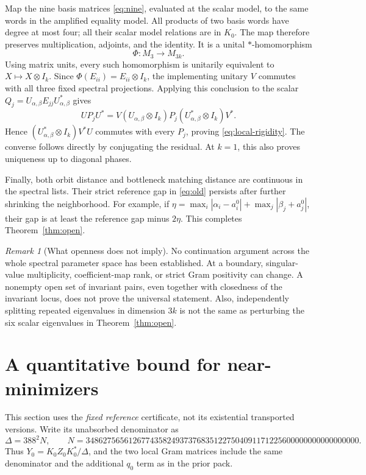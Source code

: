 \documentclass[11pt]{article}
\theoremstyle{remark}\newtheorem{remark}[theorem]{Remark}
\begin{document}
Map the nine basis matrices \eqref{eq:nine}, evaluated at the scalar model, to the same words in the amplified equality model. All products of two basis words have degree at most four; all their scalar model relations are in $K_0$. The map therefore preserves multiplication, adjoints, and the identity. It is a unital $*$-homomorphism
\[
 \Phi:M_3\longrightarrow M_{3k}.
\]
Using matrix units, every such homomorphism is unitarily equivalent to $X\mapsto X\otimes I_k$. Since $\Phi(E_{ii})=E_{ii}\otimes I_k$, the implementing unitary $V$ commutes with all three fixed spectral projections. Applying this conclusion to the scalar $Q_j=U_{\alpha,\beta}E_{jj}U_{\alpha,\beta}^*$ gives
\[
 UP_jU^*=V(U_{\alpha,\beta}\otimes I_k)P_j(U_{\alpha,\beta}^*\otimes I_k)V^*.
\]
Hence $(U_{\alpha,\beta}^*\otimes I_k)V^*U$ commutes with every $P_j$, proving \eqref{eq:local-rigidity}. The converse follows directly by conjugating the residual. At $k=1$, this also proves uniqueness up to diagonal phases.

Finally, both orbit distance and bottleneck matching distance are continuous in the spectral lists. Their strict reference gap in \eqref{eq:old} persists after further shrinking the neighborhood. For example, if $\eta=\max_i|\alpha_i-a_i^0|+\max_j|\beta_j+a_j^0|$, their gap is at least the reference gap minus $2\eta$. This completes Theorem~\ref{thm:open}.

\begin{remark}[What openness does not imply]
No continuation argument across the whole spectral parameter space has been established. At a boundary, singular-value multiplicity, coefficient-map rank, or strict Gram positivity can change. A nonempty open set of invariant pairs, even together with closedness of the invariant locus, does not prove the universal statement. Also, independently splitting repeated eigenvalues in dimension $3k$ is not the same as perturbing the six scalar eigenvalues in Theorem~\ref{thm:open}.
\end{remark}

\section{A quantitative bound for near-minimizers}
This section uses the \emph{fixed reference} certificate, not its existential transported versions. Write its unabsorbed denominator as
\[
 \Delta=388^2N,\qquad
 N=3486275656126774358249373768351227504091171225600000000000000000.
\]
Thus $Y_0=K_0Z_0K_0^*/\Delta$, and the two local Gram matrices include the same denominator and the additional $q_0$ term as in the prior pack.
\end{document}

